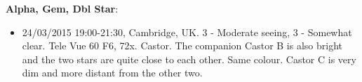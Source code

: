 {\bf Alpha, Gem, Dbl Star}:
\begin{itemize}
\item 24/03/2015 19:00-21:30, Cambridge, UK. 3 - Moderate seeing, 3 - Somewhat clear. Tele Vue 60 F6, 72x. Castor. The companion Castor B is also bright and the two stars are quite close to each other. Same colour. Castor C is very dim and more distant from the other two.
\end{itemize}
